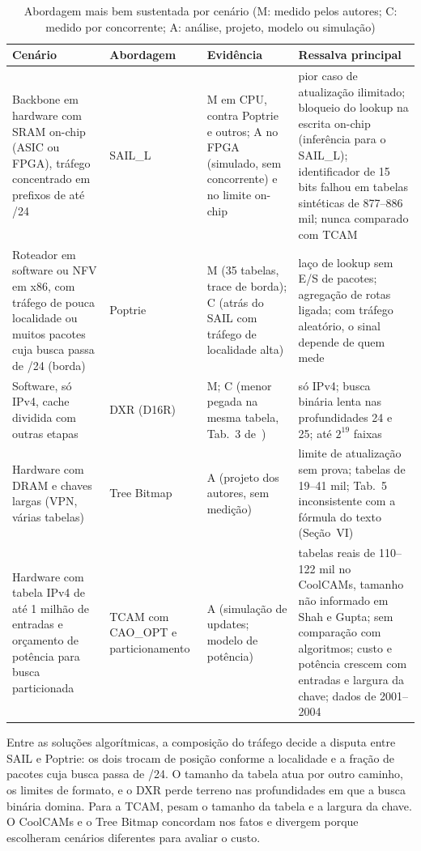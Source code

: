 \documentclass[conference,a4paper]{IEEEtran}
\begin{document}
\begin{table}[t]
\centering
\caption{Abordagem mais bem sustentada por cenário (M: medido pelos autores; C: medido por concorrente; A: análise, projeto, modelo ou simulação)}
\label{tab:cenarios}
\footnotesize
\begin{tabular}{P{4.1cm} P{2.4cm} P{3.6cm} P{5.8cm}}
\toprule
Cenário & Abordagem & Evidência & Ressalva principal \\
\midrule
Backbone em hardware com SRAM on-chip (ASIC ou FPGA), tráfego concentrado em prefixos de até /24 & SAIL\_L & M em CPU, contra Poptrie e outros; A no FPGA (simulado, sem concorrente) e no limite on-chip & pior caso de atualização ilimitado; bloqueio do lookup na escrita on-chip (inferência para o SAIL\_L); identificador de 15 bits falhou em tabelas sintéticas de 877--886 mil; nunca comparado com TCAM \\
\addlinespace
Roteador em software ou NFV em x86, com tráfego de pouca localidade ou muitos pacotes cuja busca passa de /24 (borda) & Poptrie & M (35 tabelas, trace de borda); C (atrás do SAIL com tráfego de localidade alta) & laço de lookup sem E/S de pacotes; agregação de rotas ligada; com tráfego aleatório, o sinal depende de quem mede \\
\addlinespace
Software, só IPv4, cache dividida com outras etapas & DXR (D16R) & M; C (menor pegada na mesma tabela, Tab.~3 de~\cite{asai15}) & só IPv4; busca binária lenta nas profundidades 24 e 25; até $2^{19}$ faixas \\
\addlinespace
Hardware com DRAM e chaves largas (VPN, várias tabelas) & Tree Bitmap & A (projeto dos autores, sem medição) & limite de atualização sem prova; tabelas de 19--41 mil; Tab.~5 inconsistente com a fórmula do texto (Seção~VI) \\
\addlinespace
Hardware com tabela IPv4 de até 1 milhão de entradas e orçamento de potência para busca particionada & TCAM com CAO\_OPT e particionamento & A (simulação de updates; modelo de potência) & tabelas reais de 110--122 mil no CoolCAMs, tamanho não informado em Shah e Gupta; sem comparação com algoritmos; custo e potência crescem com entradas e largura da chave; dados de 2001--2004 \\
\bottomrule
\end{tabular}
\end{table}

Entre as soluções algorítmicas, a composição do tráfego decide a disputa entre SAIL e Poptrie: os dois trocam de posição
conforme a localidade e a fração de pacotes cuja busca passa de /24. O tamanho da tabela atua por outro caminho, os limites de
formato, e o DXR perde terreno nas profundidades em que a busca binária domina. Para a TCAM, pesam o tamanho da tabela e a
largura da chave. O CoolCAMs e o Tree Bitmap concordam nos fatos e divergem porque escolheram cenários diferentes para
avaliar o custo.
\end{document}
